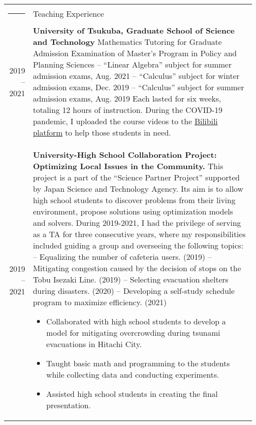 \documentclass[letterpaper,10pt]{article}
\newcommand{\headingfont}{\LARGE }
\newenvironment{SectionTable}[1]{
	\renewcommand*{\arraystretch}{1.0}
	\setlength{\tabcolsep}{10pt}
	\begin{longtable}{Rp{5.2in}} 
		\rule{2.5cm}{4pt} 
		& #1 \\ %
	}
	{
	\end{longtable}\vspace{-.3cm}
}
\begin{document}
\begin{SectionTable}{\headingfont Teaching Experience}
	2019 -- 2021 &
	\textbf{University of Tsukuba, Graduate School of Science and Technology} \newline
	Mathematics Tutoring for Graduate Admission Examination of Master's Program in Policy and Planning Sciences \newline
	-- ``Linear Algebra'' subject for summer admission exams, Aug. 2021  \newline
	-- ``Calculus'' subject for winter admission exams, Dec. 2019 \newline
	-- ``Calculus'' subject for summer admission exams, Aug. 2019 \newline
	Each lasted for six weeks, totaling 12 hours of instruction. During the COVID-19 pandemic, I uploaded the course videos to the \href{https://space.bilibili.com/16115578}{Bilibili platform} to help those students in need. \\
	 
	 2019 -- 2021 &
	 \textbf{University-High School Collaboration Project: Optimizing Local Issues in the Community.} \newline
	This project is a part of the ``Science Partner Project'' supported by Japan Science and Technology Agency. Its aim is to allow high school students to discover problems from their living environment, propose solutions using optimization models and solvers. During 2019-2021, I had the privilege of serving as a TA for three consecutive years, where my responsibilities included guiding a group and overseeing the following topics: \newline	
	--  Equalizing the number of cafeteria users. (2019) \newline
	--  Mitigating congestion caused by the decision of stops on the Tobu Isezaki Line. (2019) \newline
	--  Selecting evacuation shelters during disasters. (2020) \newline
	--  Developing a self-study schedule program to maximize efficiency. (2021) \newline	
	 \begin{itemize}[nosep, leftmargin=*] \vspace{-15pt} 
	 	\item Collaborated with high school students to develop a model for mitigating overcrowding during tsunami evacuations in Hitachi City.
	 	\item Taught basic math and programming to the students while collecting data and conducting experiments.
	 	\item Assisted high school students in creating the final presentation.
	 \vspace{-15pt} \end{itemize}
	 \\
	 

\end{SectionTable}
\end{document}
